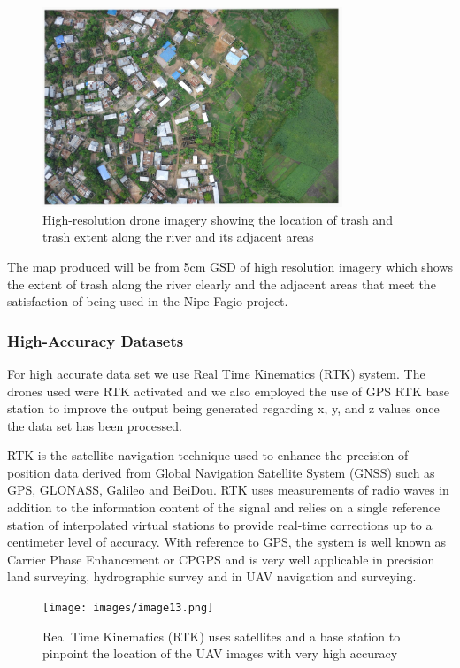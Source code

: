 \documentclass[a4paper,12pt,twoside]{article}
\begin{document}
        \begin{figure} %
            \centering
            \includegraphics[width=0.8\textwidth]{images/image1.jpg}
            \caption{High-resolution drone imagery showing the location of trash and trash extent along the river and its adjacent areas}
        \end{figure}
        
        The map produced will be from 5cm GSD of high resolution imagery which shows the extent of trash along the river clearly and the adjacent areas that meet the satisfaction of being used in the Nipe Fagio project.
    
    \subsubsection{High-Accuracy Datasets}
    
        For high accurate data set we use Real Time Kinematics (RTK) system. The  drones used were RTK activated and we also employed the use of GPS RTK base station to improve the output being generated regarding x, y, and z values once the data set has been processed.
    
        RTK is the satellite navigation technique used to enhance the precision of position data derived from Global Navigation Satellite System (GNSS) such as GPS, GLONASS, Galileo and BeiDou. RTK uses measurements of radio waves in addition to the information content of the signal and relies on a single reference station of interpolated virtual stations to provide real-time corrections up to a centimeter level of accuracy. With reference to GPS, the system is well known as Carrier Phase Enhancement or CPGPS and is very well applicable in precision land surveying, hydrographic survey and in UAV navigation and surveying.
    
        \begin{figure} %
            \centering
            \texttt{[image: images/image13.png]}
            \caption{Real Time Kinematics (RTK) uses satellites and a base station to pinpoint the location of the UAV images with very high accuracy}
        \end{figure}
    
\end{document}
